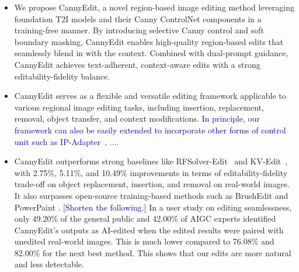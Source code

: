 \documentclass{article}
\newcommand{\kc}[1]{\textcolor{blue}{#1}}
\begin{document}
\vspace{-1mm}
\begin{itemize}[leftmargin=5mm]
\item We propose CannyEdit, a novel region-based image editing method leveraging foundation T2I models and their Canny ControlNet components in a training-free manner. By introducing selective Canny control and soft boundary masking, CannyEdit enables high-quality region-based edits that seamlessly blend in with the context. Combined with dual-prompt guidance, CannyEdit achieves text-adherent, context-aware edits with a strong editability-fidelity balance.

\vspace{-1mm}

\item CannyEdit serves as a flexible and versatile editing framework applicable to various regional image editing tasks, including insertion, replacement, removal, object transfer, and context modifications.
\kc{In principle, our framework can also be easily extended to incorporate other forms of control unit such as IP-Adapter~\cite{}, ....}

\vspace{-1mm}

\item CannyEdit outperforms strong baselines like RFSolver-Edit~\cite{wang2024taming} and KV-Edit~\citep{zhu2025kv}, with 2.75\%, 5.11\%, and 10.49\% improvements in terms of editability-fidelity trade-off on object replacement, insertion, and removal on real-world images. It also surpasses open-source training-based methods such as BrushEdit \citep{li2024brushedit} and PowerPaint \citep{zhuang2023task}.
\kc{[Shorten the following.]} In a user study on editing seamlessness, only 49.20\% of the general public and 42.00\% of AIGC experts identified CannyEdit's outputs as AI-edited when the edited results were paired with unedited real-world images. This is much lower compared to 76.08\% and 82.00\% for the next best method. This shows that our edits are more natural and less detectable.

\end{itemize}

\end{document}
